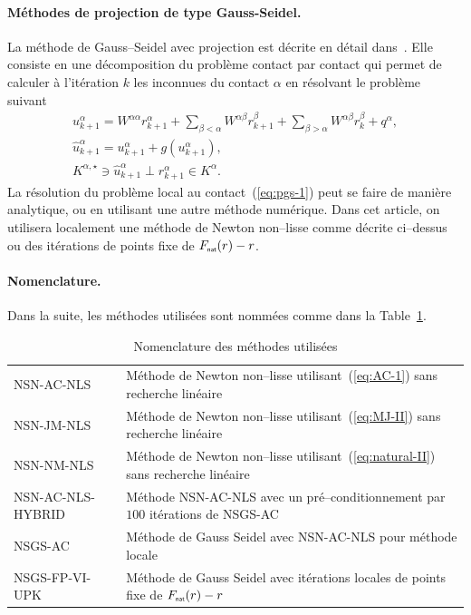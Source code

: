 \documentclass{CSMA2017}
\def\nat{{\hbox{\sf \tiny{nat}}}}
\begin{document}
\paragraph{Méthodes de projection de type Gauss-Seidel.} 
La méthode de Gauss--Seidel avec projection est décrite en détail dans~\cite{Mitsopoulou.Doudoumis1987,Jourdan.Alart.ea98}. Elle consiste en une décomposition du problème contact par contact qui permet de calculer à l'itération $k$ les inconnues du contact $\alpha$ en résolvant le problème suivant 
\begin{equation}
  \label{eq:pgs-1}
  \begin{array}{c}
  u^{\alpha}_{k+1} = W^{\alpha\alpha} r^{\alpha}_{k+1} + \sum_{\beta < \alpha}W^{\alpha\beta} r^{\beta}_{k+1} + \sum_{\beta > \alpha}W^{\alpha\beta} r^{\beta}_{k} +  q^\alpha,\\[1mm] 
  \hat u^{\alpha}_{k+1} =u^{\alpha}_{k+1} + g(u^{\alpha}_{k+1}), \\[1mm]
   K^{\alpha,\star} \ni {\hat u^{\alpha}_{k+1}} \perp r^{\alpha}_{k+1} \in K^\alpha.
 \end{array}
\end{equation}
La résolution du problème local au contact~(\ref{eq:pgs-1}) peut se faire de manière analytique, ou en utilisant une autre méthode numérique. Dans cet article, on utilisera localement une méthode de Newton non--lisse comme décrite ci--dessus ou des itérations de points fixe de $F_\nat(r)-r$.

\paragraph{Nomenclature.} 
Dans la suite, les méthodes utilisées sont nommées comme dans la Table~\ref{tab:nomenclature}.
\begin{table}
  \centering
  \begin{tabular}{ll}
    \hline
    {\sf\small NSN-AC-NLS} & Méthode de Newton non--lisse utilisant~(\ref{eq:AC-1}) sans recherche linéaire \\
    {\sf\small NSN-JM-NLS} & Méthode de Newton non--lisse utilisant~(\ref{eq:MJ-II}) sans recherche linéaire \\
    {\sf\small NSN-NM-NLS} & Méthode de Newton non--lisse utilisant~(\ref{eq:natural-II}) sans recherche linéaire \\
    {\sf\small NSN-AC-NLS-HYBRID} & Méthode {\sf\small NSN-AC-NLS} avec  un pré--conditionnement par $100$ itérations de {\sf\small NSGS-AC} \\
    {\sf\small NSGS-AC} & Méthode de Gauss Seidel avec {\sf\small NSN-AC-NLS} pour méthode locale\\
    {\sf\small  NSGS-FP-VI-UPK} & Méthode de Gauss Seidel avec itérations locales de points fixe de $F_\nat(r)-r$\\
    \hline 
  \end{tabular}
  \caption{Nomenclature des méthodes utilisées}
  \label{tab:nomenclature}
\end{table}
\end{document}
